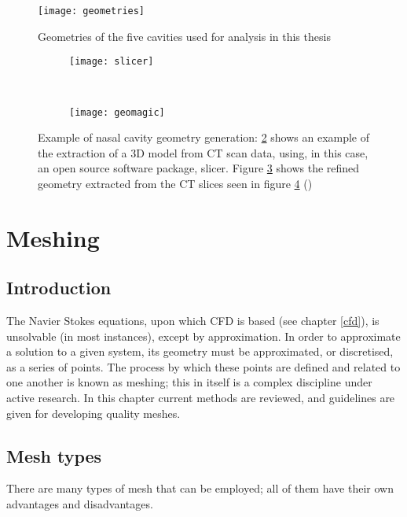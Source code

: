 \begin{figure} 
  \texttt{[image: geometries]}
  \caption{Geometries of the five cavities used for analysis in this thesis}
  \label{fig:geo}

\end{figure}
\begin{figure}[t!]

  \begin{subfigure}[t]{0.5\textwidth} 
    \texttt{[image: slicer]}
    \caption{}
    \label{fig:slicer}
  \end{subfigure}%
  ~ %
  \begin{subfigure}[t]{0.5\textwidth} 
    \texttt{[image: geomagic]}
    \caption{}
    \label{fig:geomag}
  \end{subfigure}

  \caption{Example of nasal cavity geometry generation: \ref{fig:slicer} shows an example of the extraction of a 3D model from CT scan data, using, in this case, an open source software package, slicer. Figure \ref{fig:geomag} shows the refined geometry extracted from the CT slices seen in figure \ref{fig:cavzamp} ()}
  \label{fig:cavzamp}
\end{figure}
 
\section{Meshing} \label{Meshing}
\subsection{Introduction}

The Navier Stokes equations, upon which CFD is based (see chapter \ref{cfd}), is unsolvable (in most instances), except by approximation. In order to approximate a solution to a given system, its geometry must be approximated, or discretised, as a series of points. The process by which these points are defined and related to one another is known as meshing; this in itself is a complex discipline under active research. In this chapter current methods are reviewed, and guidelines are given for developing quality meshes.
\subsection{Mesh types} \label{mtypes}

There are many types of mesh that can be employed; all of them have their own advantages and disadvantages. 

